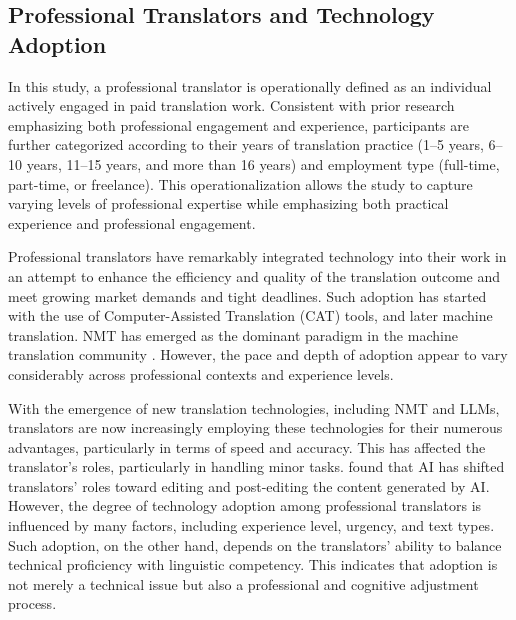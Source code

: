 \documentclass[english]{textolivre}
\begin{document}
\subsection{Professional Translators and Technology Adoption}\label{sec-modelo}
In this study, a professional translator is operationally defined as an individual actively engaged in paid translation work. Consistent with prior research emphasizing both professional engagement and experience, participants are further categorized according to their years of translation practice (1–5 years, 6–10 years, 11–15 years, and more than 16 years) and employment type (full-time, part-time, or freelance). This operationalization allows the study to capture varying levels of professional expertise while emphasizing both practical experience and professional engagement.

Professional translators have remarkably integrated technology into their work in an attempt to enhance the efficiency and quality of the translation outcome and meet growing market demands and tight deadlines. Such adoption has started with the use of Computer-Assisted Translation (CAT) tools, and later machine translation. NMT has emerged as the dominant paradigm in the machine translation community \cite{WangEtAl2022ProgressMT}. However, the pace and depth of adoption appear to vary considerably across professional contexts and experience levels.

With the emergence of new translation technologies, including NMT and LLMs, translators are now increasingly employing these technologies for their numerous advantages, particularly in terms of speed and accuracy. This has affected the translator’s roles, particularly in handling minor tasks. \textcite{AlyamiAlzubi2025HumanTranslatorsAI} found that AI has shifted translators’ roles toward editing and post-editing the content generated by AI. However, the degree of technology adoption among professional translators is influenced by many factors, including experience level, urgency, and text types. Such adoption, on the other hand, depends on the translators’ ability to balance technical proficiency with linguistic competency. This indicates that adoption is not merely a technical issue but also a professional and cognitive adjustment process.
\end{document}

